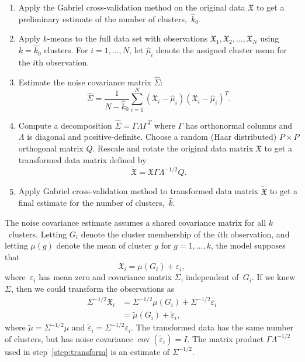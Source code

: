 \documentclass[12pt]{article}
\DeclareMathOperator*{\cov}{cov}
\newcommand{\T}{T}
\newcommand{\dataX}{\mathfrak{X}}
\begin{document}
\begin{enumerate}

  \item Apply the Gabriel cross-validation method on the original data
    $\dataX$ to get a preliminary estimate of the number of
    clusters,~$\hat k_0$.

  \item Apply $k$-means to the full data set with observations
    $\dataX_1, \dataX_2, \dotsc, \dataX_N$ using $k = \hat k_0$ clusters.
    For $i = 1, \dotsc, N$, let $\hat \mu_i$ denote the assigned cluster
    mean for the $i$th observation.

	\item Estimate the noise covariance matrix $\hat{\Sigma}$:
    \[
      \hat{\Sigma}
        =
        \frac{1}{N - \hat k_0}
        \sum^N_{i=1}
        (\dataX_i-\hat{\mu}_i)(\dataX_i-\hat{\mu}_i)^\T.
    \]

  \item \label{step:transform}
    Compute a decomposition $\hat{\Sigma} = \Gamma\Lambda\Gamma^\T$
    where $\Gamma$ has orthonormal columns and
    $\Lambda$ is diagonal and positive-definite.
    Choose a random (Haar distributed) $P \times P$ orthogonal matrix $Q$.
    Rescale and rotate the original data matrix $\dataX$ to get a
    transformed data matrix defined by
    \[
      \tilde{\dataX} = \dataX\Gamma\Lambda^{-1/2}Q.
    \]

  \item Apply Gabriel cross-validation method to transformed data matrix
    $\tilde{\dataX}$ to get a final estimate for the number of
    clusters,~$\hat k$. 

\end{enumerate}

The noise covariance estimate assumes a shared covariance matrix for all
$k$~clusters. Letting $G_i$ denote the cluster membership of the $i$th
observation, and letting $\mu(g)$ denote the mean of cluster $g$ for $g = 1,
\dotsc, k$, the model supposes that
\[
  \dataX_i = \mu(G_i)+\varepsilon_i,
\]
where~$\varepsilon_i$ has mean zero and covariance matrix $\Sigma$, independent
of~$G_i$. If we knew $\Sigma$, then we could transform the observations as
\begin{align*}
  \Sigma^{-1/2} \dataX_i
    &= \Sigma^{-1/2} \mu(G_i) + \Sigma^{-1/2} \varepsilon_i \\
    &= \tilde \mu(G_i) + \tilde \varepsilon_i,
\end{align*}
where $\tilde \mu = \Sigma^{-1/2} \mu$ and
$\tilde \varepsilon_i = \Sigma^{-1/2} \varepsilon_i$. The transformed data
has the same number of clusters, but has noise covariance
$\cov(\tilde \varepsilon_i) = I$. The matrix product $\Gamma \Lambda^{-1/2}$
used in step~\ref{step:transform} is an estimate of $\Sigma^{-1/2}$.
\end{document}
